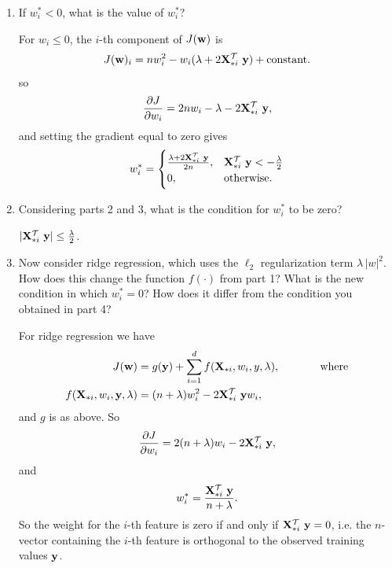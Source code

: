 \begin{enumerate}
\item
If $w_i^* < 0$, what is the value of $w_i^*$?

\begin{mdframed}
For $w_i \leq 0$, the $i$-th component of $J(\mathbf w)$ is
\begin{align*}
  J(\mathbf w)_i = nw_i^2 - w_i (\lambda  + 2\mathbf X_{*i}^\mathcal T ~\mathbf y) + \text{constant}.
\end{align*}
so
\begin{align*}
  \frac{\partial J}{\partial w_i} = 2nw_i - \lambda - 2\mathbf X_{*i}^\mathcal T ~\mathbf y,
\end{align*}
and setting the gradient equal to zero gives
\begin{align*}
  w^*_i =
  \begin{cases}
    \frac{ \lambda + 2\mathbf X_{*i}^\mathcal T ~\mathbf y }{2n}, &\mathbf X_{*i}^\mathcal T ~\mathbf y  < -\frac{\lambda}{2}\\
    0,                                     &\text{otherwise}.
  \end{cases}
\end{align*}
\end{mdframed}


\item
Considering parts 2 and 3, what is the condition for $w_i^*$ to be zero?
\begin{mdframed}
  $|\mathbf X_{*i}^\mathcal T ~\mathbf y| \leq \frac{\lambda}{2}$.
\end{mdframed}

\item
Now consider ridge regression, which uses the $\ell_2$ regularization term $\lambda \, |w|^2$.
How does this change the function $f(\cdot)$ from part 1?
What is the new condition in which $w_i^* = 0$?
How does it differ from the condition you obtained in part 4?

\begin{mdframed}
For ridge regression we have
\begin{align*}
  J(\mathbf w) &= g(\mathbf y) + \sum_{i=1}^d f(\mathbf X_{*i}, w_i, y, \lambda), ~~~~~~~~~~~\text{where}\\
  f(\mathbf X_{*i}, w_i, \mathbf y, \lambda) &= (n+\lambda)w_i^2 - 2\mathbf X_{*i}^\mathcal T ~\mathbf y w_i,
\end{align*}
and $g$ is as above. So
\begin{align*}
  \frac{\partial J}{\partial w_i} = 2(n + \lambda)w_i - 2\mathbf X_{*i}^\mathcal T ~\mathbf y,
\end{align*}
and
\begin{align*}
  w^*_i = \frac{ \mathbf X_{*i}^\mathcal T ~\mathbf y }{n + \lambda}.
\end{align*}
So the weight for the $i$-th feature is zero if and only if
$\mathbf X_{*i}^\mathcal T ~\mathbf y = 0$, i.e. the $n$-vector containing the $i$-th feature is
orthogonal to the observed training values $\mathbf y$.


\end{mdframed}
\end{enumerate}
